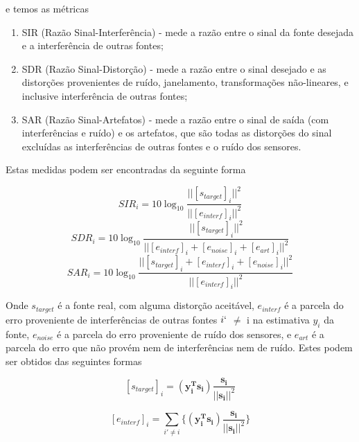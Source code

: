     e temos as métricas
    \begin{enumerate}
        \item SIR (Razão Sinal-Interferência) - mede a razão entre o sinal da fonte desejada e a interferência de outras fontes;
        \item SDR (Razão Sinal-Distorção) - mede a razão entre o sinal desejado e as distorções provenientes de ruído, janelamento, transformações não-lineares, e inclusive interferência de outras fontes;
        \item SAR (Razão Sinal-Artefatos) - mede a razão entre o sinal de saída (com interferências e ruído) e os artefatos, que são todas as distorções do sinal excluídas as interferências de outras fontes e o ruído dos sensores.
    \end{enumerate}
    
    Estas medidas podem ser encontradas da seguinte forma
    
    \begin{equation}
        \label{eq:sir}
        SIR_i = 10\log_{10} \frac{|| [s_{target}]_i ||^2}{|| [e_{interf}]_i ||^2}
    \end{equation}
    \medskip
    \begin{equation}
        \label{eq:sdr}
        SDR_i = 10\log_{10} \frac{|| [s_{target}]_i ||^2}{|| [e_{interf}]_i + [e_{noise}]_i + [e_{art}]_i   ||^2}
    \end{equation}
    \medskip
    \begin{equation}
        \label{eq:sar}
        SAR_i = 10\log_{10} \frac{|| [s_{target}]_i + [e_{interf}]_i + [e_{noise}]_i ||^2}{|| [e_{interf}]_i ||^2}
    \end{equation}
    
    Onde $s_{target}$ é a fonte real, com alguma distorção aceitável, $e_{interf}$  é a parcela do erro
proveniente de interferências de outras fontes $i`$ $\neq$ i na estimativa $y_i$ da fonte, $e_{noise}$
é a parcela do erro proveniente de ruído dos sensores, e $e_{art}$ é a parcela do erro que não provém nem de interferências nem de ruído. Estes podem ser obtidos das seguintes formas

    \begin{equation}
        \label{eq:star}
         [s_{target}]_i  = (\mathbf{y_i^Ts_i})\frac{\mathbf{s_i}}{||\mathbf{s_i}||^2}
    \end{equation}
    
    \medskip
    
    \begin{equation}
        \label{eq:eint}
         [e_{interf}]_i  = \sum_{i' \neq i} \{(\mathbf{y_i^Ts_i})\frac{\mathbf{s_i}}{||\mathbf{s_i}||^2}\}
    \end{equation}
    
